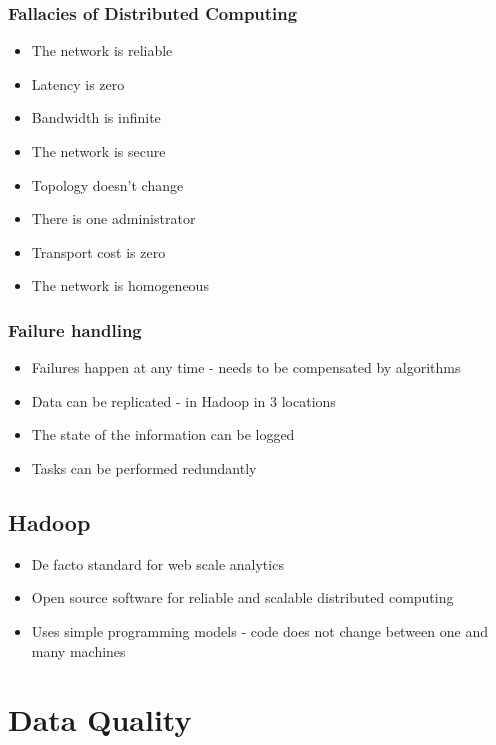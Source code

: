 \documentclass[10pt,a4paper]{scrreprt}
\begin{document}
\subsection{Fallacies of Distributed Computing}
\begin{itemize}
	\item The network is reliable
	\item Latency is zero
	\item Bandwidth is infinite
	\item The network is secure
	\item Topology doesn't change
	\item There is one administrator
	\item Transport cost is zero
	\item The network is homogeneous
\end{itemize}

\subsection{Failure handling}
\begin{itemize}
	\item Failures happen at any time - needs to be compensated by algorithms
	\item Data can be replicated - in Hadoop in 3 locations
	\item The state of the information can be logged
	\item Tasks can be performed redundantly
\end{itemize}



\section{Hadoop}
\begin{itemize}
	\item De facto standard for web scale analytics
	\item Open source software for reliable and scalable distributed computing
	\item Uses simple programming models - code does not change between one and many machines
	
\end{itemize}



\chapter{Data Quality}
\end{document}
